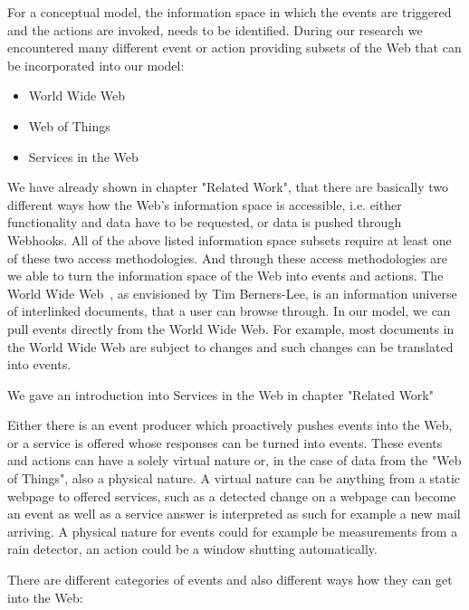 For a conceptual model, the information space in which the events are triggered and the actions are invoked, needs to be identified.
During our research we encountered many different event or action providing subsets of the Web that can be incorporated into our model:
\begin{itemize}
  \item \textrm{World Wide Web}
  \item \textrm{Web of Things}
  \item Services in the Web
\end{itemize}
We have already shown in chapter "Related Work", that there are basically two different ways how the Web's information space is accessible, i.e. either functionality and data have to be requested, or data is pushed through Webhooks.
All of the above listed information space subsets require at least one of these two access methodologies.
And through these access methodologies are we able to turn the information space of the Web into events and actions.
The \textrm{World Wide Web}~\cite{DBLP:journals/en/Berners-LeeCGP92}, as envisioned by Tim Berners-Lee, is an information universe of interlinked documents, that a user can browse through.
In our model, we can pull events directly from the World Wide Web.
For example, most documents in the World Wide Web are subject to changes and such changes can be translated into events.

We gave an introduction into \textrm{Services in the Web} in chapter "Related Work"


Either there is an event producer which proactively pushes events into the Web, or a service is offered whose responses can be turned into events.
These events and actions can have a solely virtual nature or, in the case of data from the \textrm{"Web of Things"}, also a physical nature.
A virtual nature can be anything from a static webpage to offered services, such as a detected change on a webpage can become an event as well as a service answer is interpreted as such for example a new mail arriving.
A physical nature for events could for example be measurements from a rain detector, an action could be a window shutting automatically.

There are different categories of events and also different ways how they can get into the Web:

